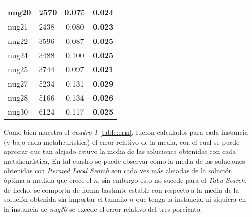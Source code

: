 \documentclass{ci5652}
\begin{document}
\begin{table}[ht]
\begin{tabular}{ll|c|c|}
  \multicolumn{1}{|l|}{nug20}              & 2570                              & 0.075                       & \textbf{0.024}             \\ \hline
  \multicolumn{1}{|l|}{nug21}              & 2438                              & 0.080                       & \textbf{0.023}             \\ \hline
  \multicolumn{1}{|l|}{nug22}              & 3596                              & 0.087                       & \textbf{0.025}             \\ \hline
  \multicolumn{1}{|l|}{nug24}              & 3488                              & 0.100                       & \textbf{0.025}             \\ \hline
  \multicolumn{1}{|l|}{nug25}              & 3744                              & 0.097                       & \textbf{0.021}             \\ \hline
  \multicolumn{1}{|l|}{nug27}              & 5234                              & 0.131                       & \textbf{0.029}             \\ \hline
  \multicolumn{1}{|l|}{nug28}              & 5166                              & 0.134                       & \textbf{0.026}             \\ \hline
  \multicolumn{1}{|l|}{nug30}              & 6124                              & 0.117                       & \textbf{0.025}             \\ \hline
  	\end{tabular}
\end{table}

Como bien muestra el \textit{cuadro 1} \ref{table:erm}, fueron calculados para cada instancia (y bajo cada metaheurística) el error relativo de la media, con el cual se puede apreciar que tan alejado estuvo la media de las soluciones obtenidas con cada metaheurística, En tal cuadro se puede observar como la media de las soluciones obtenidas con \textit{Iterated Local Search} son cada vez más alejadas de la solución óptima a medida que crece el \(n\), sin embargo esto no sucede para el \textit{Tabu Search}, de hecho, se comporta de forma bastante estable con respecto a la media de la solución obtenida sin importar el tamaño \(n\) que tenga la instancia, ni siquiera en la instancia de \textit{nug30} se excede el error relativo del tres porciento. 
\end{document}
